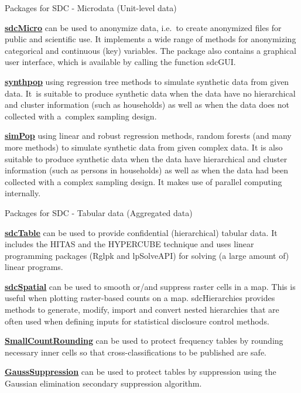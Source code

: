\documentclass[
	aspectratio = 169
 ]{beamer}
\begin{document}
\begin{frame}{Packages for SDC - Microdata (Unit-level data)}

\href{https://cran.r-project.org/web/packages/sdcMicro/index.html}{\color{blue}\underline{\textbf{sdcMicro}}}
can be used to anonymize data, i.e.~to create anonymized files for
public and scientific use. It implements a wide range of methods for
anonymizing categorical and continuous (key) variables. The package also
contains a graphical user interface, which is available by calling the
function sdcGUI.

\href{https://cran.r-project.org/web/packages/synthpop/index.html}{\color{blue}\underline{\textbf{synthpop}}}
using regression tree methods to simulate synthetic data from given
data. It~is suitable to produce synthetic data when the data have no
hierarchical and cluster information (such as households) as well as
when the data does not collected with a~complex sampling design.

\href{https://cran.r-project.org/web/packages/simPop/index.html}{\color{blue}\underline{\textbf{simPop}}}
using linear and robust regression methods, random forests (and many
more methods) to simulate synthetic data from given complex data. It is
also suitable to produce synthetic data when the data have hierarchical
and cluster information (such as persons in households) as well as when
the data had been collected with a complex sampling design. It makes use
of parallel computing internally.

\end{frame}
\begin{frame}{Packages for SDC - Tabular data (Aggregated data)}

\href{https://cran.r-project.org/web/packages/sdcTable/index.html}{\color{blue}\underline{\textbf{sdcTable}}}
can be used to provide confidential (hierarchical) tabular data. It
includes the HITAS and the HYPERCUBE technique and uses linear
programming packages (Rglpk and lpSolveAPI) for solving (a large amount
of) linear programs.

\href{https://cran.r-project.org/web/packages/sdcSpatial/index.html}{\color{blue}\underline{\textbf{sdcSpatial}}}
can be used to smooth or/and suppress raster cells in a map. This is
useful when plotting raster-based counts on a map. sdcHierarchies
provides methods to generate, modify, import and convert nested
hierarchies that are often used when defining inputs for statistical
disclosure control methods.

\href{https://cran.r-project.org/web/packages/SmallCountRounding/index.html}{\color{blue}\underline{\textbf{SmallCountRounding}}}
can be used to protect frequency tables by rounding necessary inner
cells so that cross-classifications to be published are safe.

\href{https://cran.r-project.org/web/packages/GaussSuppression/index.html}{\color{blue}\underline{\textbf{GaussSuppression}}}
can be used to protect tables by suppression using the Gaussian
elimination secondary suppression algorithm.

\end{frame}
\end{document}
